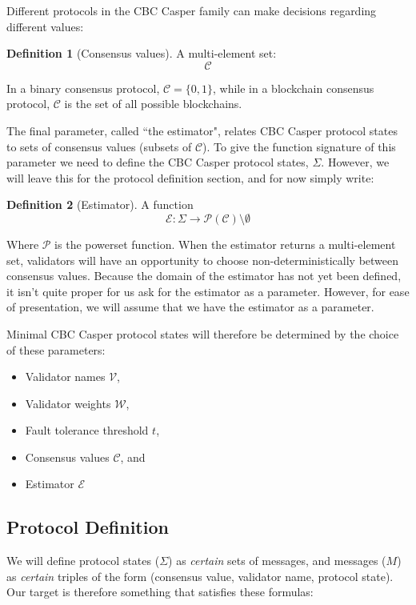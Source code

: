 \documentclass{article}
\theoremstyle{definition}
\newtheorem{defn}{Definition}[section]
\begin{document}
Different protocols in the CBC Casper family can make decisions regarding different values:

\begin{defn}[Consensus values]
A multi-element set:
$$
\mathcal{C}
$$
\end{defn}

In a binary consensus protocol, $\mathcal{C} = \{0,1\}$, while in a blockchain consensus protocol, $\mathcal{C}$ is the set of all possible blockchains.

The final parameter, called ``the estimator", relates CBC Casper protocol states to sets of consensus values (subsets of $\mathcal{C}$). To give the function signature of this parameter we need to define the CBC Casper protocol states, $\Sigma$. However, we will leave this for the protocol definition section, and for now simply write:

\begin{defn}[Estimator]
A function
$$
\mathcal{E}: \Sigma \to \mathcal{P}(\mathcal{C})\setminus\emptyset
$$
\end{defn}

Where $\mathcal{P}$ is the powerset function. When the estimator returns a multi-element set, validators will have an opportunity to choose non-deterministically between consensus values. Because the domain of the estimator has not yet been defined, it isn't quite proper for us ask for the estimator as a parameter. However, for ease of presentation, we will assume that we have the estimator as a parameter.

Minimal CBC Casper protocol states will therefore be determined by the choice of these parameters:

\begin{itemize}
\item Validator names $\mathcal{V}$,
\item Validator weights $\mathcal{W}$,
\item Fault tolerance threshold $t$,
\item Consensus values $\mathcal{C}$, and
\item Estimator $\mathcal{E}$
\end{itemize}

\pagebreak
\subsection{Protocol Definition}

We will define protocol states ($\Sigma$) as \emph{certain} sets of messages, and messages ($M$) as \emph{certain} triples of the form (consensus value, validator name, protocol state). Our target is therefore something that satisfies these formulas:
\end{document}
